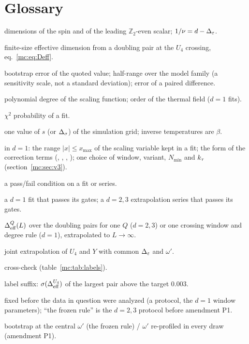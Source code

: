 \section{Glossary}
\begin{description}[leftmargin=1.2em]
\item[$\Ds$, $\De$] dimensions of the spin and of the leading $\mathbb Z_2$-even scalar; $1/\nu=d-\Delta_\varepsilon$.
\item[$\Deff^Q$] finite-size effective dimension from a doubling pair at the $U_4$ crossing, eq.~\eqref{mc:eq:Deff}.
\item[$\sstat$, $\ssys$, $\sigma_D$] bootstrap error of the quoted value; half-range over the model family (a sensitivity scale, not a standard
 deviation); error of a paired difference.
\item[$p$, $\ktau$] polynomial degree of the scaling function; order of the thermal field ($d=1$ fits).
\item[$P_{\chi^2}$] $\chi^2$ probability of a fit.
\item[coupling] one value of $s$ (or $\Ds$) of the simulation grid; inverse temperatures are $\beta$.
\item[window, variant, configuration] in $d=1$: the range $|x|\le x_{\max}$ of the scaling variable kept in a fit; the form of the correction
 terms (, , , ); one choice of window, variant, $N_{\min}$ and $\ktau$
 (section~\ref{mc:sec:v3}).
\item[gate] a pass/fail condition on a fit or series.
\item[quotable, eligible] a $d=1$ fit that passes its gates; a $d=2,3$ extrapolation series that passes its gates.
\item[series] $\Delta_{\rm eff}^Q(L)$ over the doubling pairs for one $Q$ ($d=2,3$) or one crossing window and degree rule ($d=1$), extrapolated to
 $L\to\infty$.
\item[U4+Y] joint extrapolation of $U_4$ and $Y$ with common $\De$ and $\omega'$.
\item[x-check] cross-check (table~\ref{mc:tab:labels}).
\item[{[$\sigma$]}] label suffix: $\sigma(\Delta_{\rm eff}^{U_4})$ of the largest pair above the target 0.003.
\item[frozen] fixed before the data in question were analyzed (a protocol, the $d=1$ window parameters); ``the frozen rule'' is the
 $d=2,3$ protocol before amendment P1.
\item[fixed-$\omega'$ / profiled rule] bootstrap at the central $\omega'$ (the frozen rule) / $\omega'$ re-profiled in every draw (amendment P1).

\end{description}
